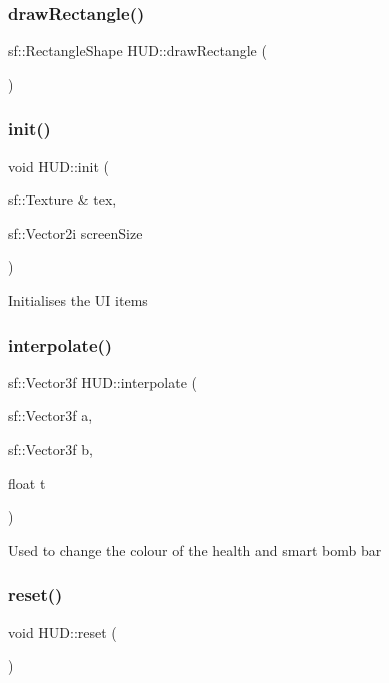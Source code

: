 \subsubsection{\texorpdfstring{draw\+Rectangle()}{drawRectangle()}}
{\footnotesize\ttfamily sf\+::\+Rectangle\+Shape H\+U\+D\+::draw\+Rectangle (\begin{DoxyParamCaption}{ }\end{DoxyParamCaption})}

\mbox{\label{class_h_u_d_abcd24489d983e367e38f1ee35e4f0cef}} 
\subsubsection{\texorpdfstring{init()}{init()}}
{\footnotesize\ttfamily void H\+U\+D\+::init (\begin{DoxyParamCaption}\item[{sf\+::\+Texture \&}]{tex,  }\item[{sf\+::\+Vector2i}]{screen\+Size }\end{DoxyParamCaption})}

Initialises the UI items \mbox{\label{class_h_u_d_aeb9ac3973c124a7e893d6c3cc9c8688f}} 
\subsubsection{\texorpdfstring{interpolate()}{interpolate()}}
{\footnotesize\ttfamily sf\+::\+Vector3f H\+U\+D\+::interpolate (\begin{DoxyParamCaption}\item[{sf\+::\+Vector3f}]{a,  }\item[{sf\+::\+Vector3f}]{b,  }\item[{float}]{t }\end{DoxyParamCaption})}

Used to change the colour of the health and smart bomb bar \mbox{\label{class_h_u_d_a9800d7a76e53e33264f444fd5c863bff}} 
\subsubsection{\texorpdfstring{reset()}{reset()}}
{\footnotesize\ttfamily void H\+U\+D\+::reset (\begin{DoxyParamCaption}{ }\end{DoxyParamCaption})}

